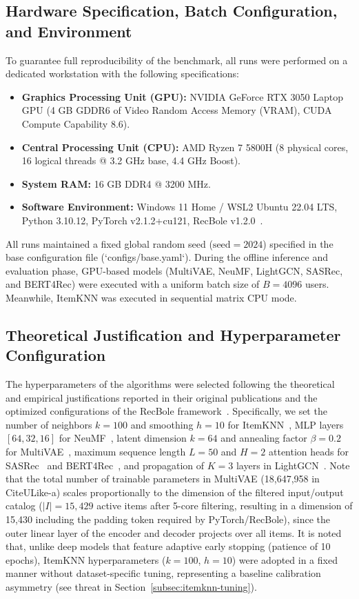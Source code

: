 \documentclass[journal]{IEEEtran}
\begin{document}
\subsection{Hardware Specification, Batch Configuration, and Environment}
To guarantee full reproducibility of the benchmark, all runs were performed on a dedicated workstation with the following specifications:
\begin{itemize}
    \item \textbf{Graphics Processing Unit (GPU):} NVIDIA GeForce RTX 3050 Laptop GPU (4 GB GDDR6 of Video Random Access Memory (VRAM), CUDA Compute Capability 8.6).
    \item \textbf{Central Processing Unit (CPU):} AMD Ryzen 7 5800H (8 physical cores, 16 logical threads @ 3.2 GHz base, 4.4 GHz Boost).
    \item \textbf{System RAM:} 16 GB DDR4 @ 3200 MHz.
    \item \textbf{Software Environment:} Windows 11 Home / WSL2 Ubuntu 22.04 LTS, Python 3.10.12, PyTorch v2.1.2+cu121, RecBole v1.2.0~\cite{zhao2021recbole}.
\end{itemize}

All runs maintained a fixed global random seed ($\text{seed} = 2024$) specified in the base configuration file (`configs/base.yaml`). During the offline inference and evaluation phase, GPU-based models (MultiVAE, NeuMF, LightGCN, SASRec, and BERT4Rec) were executed with a uniform batch size of $B=4096$ users. Meanwhile, ItemKNN was executed in sequential matrix CPU mode.

\subsection{Theoretical Justification and Hyperparameter Configuration}
The hyperparameters of the algorithms were selected following the theoretical and empirical justifications reported in their original publications and the optimized configurations of the RecBole framework~\cite{zhao2021recbole}. Specifically, we set the number of neighbors $k=100$ and smoothing $h=10$ for ItemKNN~\cite{sarwar2001item}, MLP layers $[64, 32, 16]$ for NeuMF~\cite{he2017neural}, latent dimension $k=64$ and annealing factor $\beta=0.2$ for MultiVAE~\cite{liang2018variational}, maximum sequence length $L=50$ and $H=2$ attention heads for SASRec~\cite{kang2018self} and BERT4Rec~\cite{sun2019bert4rec}, and propagation of $K=3$ layers in LightGCN~\cite{he2020lightgcn}. Note that the total number of trainable parameters in MultiVAE (18,647,958 in CiteULike-a) scales proportionally to the dimension of the filtered input/output catalog ($|I| = 15,429$ active items after 5-core filtering, resulting in a dimension of 15,430 including the padding token required by PyTorch/RecBole), since the outer linear layer of the encoder and decoder projects over all items. It is noted that, unlike deep models that feature adaptive early stopping (patience of 10 epochs), ItemKNN hyperparameters ($k=100$, $h=10$) were adopted in a fixed manner without dataset-specific tuning, representing a baseline calibration asymmetry (see threat in Section~\ref{subsec:itemknn-tuning}).
\end{document}
